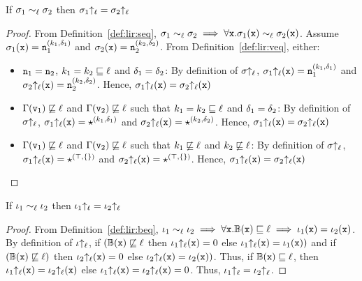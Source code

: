 \begin{myLemma}
\label{lem:app:lir:sigequ}
If $\sigma_1 \sim_\ell \sigma_2$ then $\sigma_1{\uparrow_\ell} = \sigma_2{\uparrow_\ell}$
\end{myLemma}
\begin{proof}
From Definition~\ref{def:lir:seq}, $\sigma_1 \sim_\ell \sigma_2 \implies \forall
\texttt{x}. \sigma_1(\texttt{x}) \sim_\ell \sigma_2(\texttt{x})$. Assume $\sigma_1(\texttt{x}) = \texttt{n}_1^{(k_1,
  \delta_1)}$ and $\sigma_2(\texttt{x}) = \texttt{n}_2^{(k_2, \delta_2)}$. 
From Definition~\ref{def:lir:veq}, either:
\begin{itemize}
\item $\texttt{n}_1 = \texttt{n}_2$, $k_1 = k_2 \sqsubseteq \ell$ and $\delta_1
  = \delta_2$: By definition of $\sigma{\uparrow_\ell}$, $\sigma_1{\uparrow_\ell}(\texttt{x}) =
  \texttt{n}_1^{(k_1, \delta_1)}$ and $\sigma_2{\uparrow_\ell}(\texttt{x}) = \texttt{n}_2^{(k_2,
    \delta_2)}$. Hence, $\sigma_1{\uparrow_\ell}(\texttt{x}) = \sigma_2{\uparrow_\ell}(\texttt{x})$
\item $\Gamma(\texttt{v}_1) \not\sqsubseteq  \ell$ and $\Gamma(\texttt{v}_2)
  \not\sqsubseteq \ell$ such that $k_1 = k_2 \sqsubseteq
  \ell$ and $\delta_1 = \delta_2$: By definition of $\sigma{\uparrow_\ell}$,
  $\sigma_1{\uparrow_\ell}(\texttt{x}) = \star^{(k_1, \delta_1)}$ and $\sigma_2{\uparrow_\ell}(\texttt{x}) =
  \star^{(k_2, \delta_2)}$. Hence, $\sigma_1{\uparrow_\ell}(\texttt{x}) = \sigma_2{\uparrow_\ell}(\texttt{x})$
\item $\Gamma(\texttt{v}_1) \not\sqsubseteq  \ell$ and $\Gamma(\texttt{v}_2)
  \not\sqsubseteq \ell$ such that $k_1 \not\sqsubseteq
  \ell$ and $k_2 \not\sqsubseteq \ell$: By definition of
  $\sigma{\uparrow_\ell}$, $\sigma_1{\uparrow_\ell}(\texttt{x}) = \star^{(\top, \{\})}$ and
  $\sigma_2{\uparrow_\ell}(\texttt{x}) = \star^{(\top, \{\})}$. Hence, $\sigma_1{\uparrow_\ell}(\texttt{x})
  = \sigma_2{\uparrow_\ell}(\texttt{x})$ 
\end{itemize}
\end{proof}

\begin{myLemma}
\label{lem:app:lir:beq}
If $\iota_1 \sim_\ell \iota_2$ then $\iota_1{\uparrow_\ell} = \iota_2{\uparrow_\ell}$  
\end{myLemma}
\begin{proof}
From Definition~\ref{def:lir:beq}, $\iota_1 \sim_\ell \iota_2 \implies \forall
\texttt{x}. \mathbb{B}(\texttt{x}) \sqsubseteq \ell \implies \iota_1(\texttt{x}) =
\iota_2(\texttt{x})$. By definition of $\iota{\uparrow_\ell}$, if $(\mathbb{B}(\texttt{x})
\not\sqsubseteq \ell$ then $\iota_1{\uparrow_\ell}(\texttt{x}) = 0$ else
$\iota_1{\uparrow_\ell}(\texttt{x}) = \iota_1(\texttt{x}))$
and if $(\mathbb{B}(\texttt{x}) \not\sqsubseteq \ell)$ then
$\iota_2{\uparrow_\ell}(\texttt{x}) = 0$ else  $\iota_2{\uparrow_\ell}(\texttt{x}) = \iota_2(\texttt{x}))$.
Thus, if $\mathbb{B}(\texttt{x}) \sqsubseteq \ell$, then $\iota_1{\uparrow_\ell}(\texttt{x}) =
\iota_2{\uparrow_\ell}(\texttt{x})$ else $\iota_1{\uparrow_\ell}(\texttt{x}) = \iota_2{\uparrow_\ell}(\texttt{x}) = 0$. 
Thus, $\iota_1{\uparrow_\ell} = \iota_2{\uparrow_\ell}$.
\end{proof}

